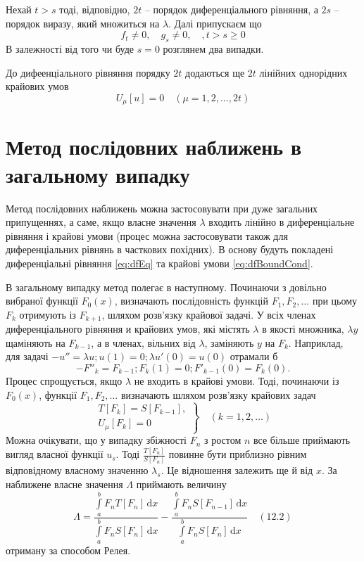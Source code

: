 \documentclass[12pt,a4paper]{article}
\begin{document}
Нехай $t>s$ тоді, відповідно, $2t$ -- порядок диференціального рівняння, а $2s$ -- порядок виразу, який множиться на $\lambda$. Далі припускаєм що
\[
f_t \not= 0, \quad g_s \not= 0, \quad, t>s\ge0
\]
В залежності від того чи буде $s=0$ розглянем два випадки.

До дифеенціального рівняння порядку $2t$ додаються ще $2t$ лінійних однорідних крайових умов
\begin{equation}\label{eq:dfBoundCond}
	U_\mu [u] = 0 \quad (\mu = 1, 2, \dots, 2t)
\end{equation}

\clearpage

\section{Метод послідовних наближень в загальному випадку}Метод послідовних наближень можна застосовувати при дуже загальних припущеннях, а саме, якщо власне значення $\lambda$ входить лінійно в диференціальне рівняння і крайові умови (процес можна застосовувати також для диференціальних рівнянь в часткових похідних). В основу будуть покладені диференціальні рівняння \eqref{eq:dfEq} та крайові умови \eqref{eq:dfBoundCond}.

В загальному випадку метод полегає в наступному. Починаючи з довільно вибраної функції $F_0(x)$, визначають послідовність функцій $F_1, F_2, \dots$ при цьому $F_k$ отримують із $F_{k+1}$, шляхом розв'язку крайової задачі. У всіх членах диференціального рівняння и крайових умов, які містять $\lambda$ в якості множника, $\lambda y$ щаміняють на $F_{k-1}$, а в членах, вільних від $\lambda$, заміняють $y$ на $F_k$. Наприклад, для задачі $- u'' = \lambda u; u(1) = 0; \lambda u'(0) = u(0)$ отрамали б
\[
	- F''_k = F_{k-1}; F_k(1) = 0; F'_{k-1}(0) = F_k(0).
\] 
Процес спрощується, якщо $\lambda$ не входить в крайові умови. Тоді, починаючи із $F_0(x)$, функції $F_1, F_2, \dots$ визначають шляхом розв'язку крайових задач
\begin{equation}\label{eq:recF_i}
	\left.
	\begin{array}{l}
		T[F_k] = S[F_{k-1}],\\
		U_\mu[F_k] = 0
	\end{array} \right\}
	\quad
	(k = 1, 2, \dots)
\end{equation}
Можна очікувати, що у випадку збіжності $F_n$ з ростом $n$ все більше приймають вигляд власної функції $u_s$. Тоді $\frac{T[F_n]}{S[F_n]}$ повинне бути приблизно рівним відповідному власному значенню $\lambda_s$. Це відношення залежить ще й від $x$. За наближене власне значення $\Lambda$ приймають величину
\[
\Lambda = \frac{\int\limits_a^b F_n T[F_n]\,\mathrm{d}x}
			   {\int\limits_a^b F_n S[F_n]\,\mathrm{d}x}
		  -
		  \frac{\int\limits_a^b F_n S[F_{n-1}]\,\mathrm{d}x}
			   {\int\limits_a^b F_n S[F_n]\,\mathrm{d}x}
   \quad (12.2)
\]
отриману за способом Релея.
\end{document}

